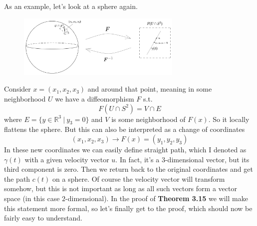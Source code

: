 \documentclass[12pt]{article}
\theoremstyle{definition}
\begin{document}
As an example, let's look at a sphere again. 
\begin{figure}[h!]
    \includegraphics[width=0.7\textwidth]{figures/3.png}
    \centering 
\end{figure}
Consider $x = (x_1, x_2, x_3)$ and around that point, meaning in some neighborhood $U$ we have a diffeomorphism $F$ s.t. 
\begin{equation}
    F(U \cap S^2) = V \cap E 
\end{equation}
where $E = \{y \in \mathbb{R}^3 \ | \ y_3 = 0\}$ and $V$ is some neighborhood of $F(x)$. So it locally flattens the sphere. But this can also be interpreted as a change of coordinates 
\begin{equation}
    (x_1, x_2, x_3) \to F(x) = (y_1, y_2, y_3)
\end{equation}
In these new coordinates we can easily define straight path, which I denoted as $\gamma(t)$ with a given velocity vector $u$. In fact, it's a $3$-dimensional vector, but its third component is zero. Then we return back to the original coordinates and get the path $c(t)$ on a sphere. Of course the velocity vector will transform somehow, but this is not important as long as all such vectors form a vector space (in this case $2$-dimensional). In the proof of \textbf{Theorem 3.15} we will make this statement more formal, so let's finally get to the proof, which should now be fairly easy to understand. 
\end{document}
